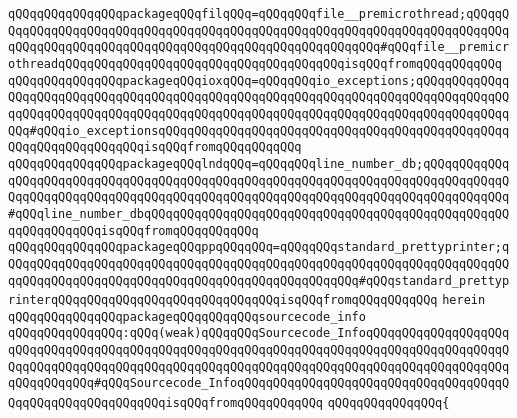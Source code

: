 \verb|qQQqqQQqqQQqqQQqpackageqQQqfilqQQq=qQQqqQQqfile__premicrothread;qQQqqQQqqQQqqQQqqQQqqQQqqQQqqQQqqQQqqQQqqQQqqQQqqQQqqQQqqQQqqQQqqQQqqQQqqQQqqQQqqQQqqQQqqQQqqQQqqQQqqQQqqQQqqQQqqQQqqQQqqQQqqQQq#qQQqfile__premicrothreadqQQqqQQqqQQqqQQqqQQqqQQqqQQqqQQqqQQqqQQqisqQQqfromqQQqqQQqqQQq|\newline
\verb|qQQqqQQqqQQqqQQqpackageqQQqioxqQQq=qQQqqQQqio_exceptions;qQQqqQQqqQQqqQQqqQQqqQQqqQQqqQQqqQQqqQQqqQQqqQQqqQQqqQQqqQQqqQQqqQQqqQQqqQQqqQQqqQQqqQQqqQQqqQQqqQQqqQQqqQQqqQQqqQQqqQQqqQQqqQQqqQQqqQQqqQQqqQQqqQQqqQQqqQQq#qQQqio_exceptionsqQQqqQQqqQQqqQQqqQQqqQQqqQQqqQQqqQQqqQQqqQQqqQQqqQQqqQQqqQQqqQQqqQQqisqQQqfromqQQqqQQqqQQq|\newline
\verb|qQQqqQQqqQQqqQQqpackageqQQqlndqQQq=qQQqqQQqline_number_db;qQQqqQQqqQQqqQQqqQQqqQQqqQQqqQQqqQQqqQQqqQQqqQQqqQQqqQQqqQQqqQQqqQQqqQQqqQQqqQQqqQQqqQQqqQQqqQQqqQQqqQQqqQQqqQQqqQQqqQQqqQQqqQQqqQQqqQQqqQQqqQQqqQQqqQQq#qQQqline_number_dbqQQqqQQqqQQqqQQqqQQqqQQqqQQqqQQqqQQqqQQqqQQqqQQqqQQqqQQqqQQqqQQqisqQQqfromqQQqqQQqqQQq|\newline
\verb|qQQqqQQqqQQqqQQqpackageqQQqppqQQqqQQq=qQQqqQQqstandard_prettyprinter;qQQqqQQqqQQqqQQqqQQqqQQqqQQqqQQqqQQqqQQqqQQqqQQqqQQqqQQqqQQqqQQqqQQqqQQqqQQqqQQqqQQqqQQqqQQqqQQqqQQqqQQqqQQqqQQqqQQqqQQq#qQQqstandard_prettyprinterqQQqqQQqqQQqqQQqqQQqqQQqqQQqqQQqisqQQqfromqQQqqQQqqQQq|\newline
\verb|herein|\newline
\newline
\verb|qQQqqQQqqQQqqQQqpackageqQQqqQQqqQQqsourcecode_info|\newline
\verb|qQQqqQQqqQQqqQQq:qQQq(weak)qQQqqQQqSourcecode_InfoqQQqqQQqqQQqqQQqqQQqqQQqqQQqqQQqqQQqqQQqqQQqqQQqqQQqqQQqqQQqqQQqqQQqqQQqqQQqqQQqqQQqqQQqqQQqqQQqqQQqqQQqqQQqqQQqqQQqqQQqqQQqqQQqqQQqqQQqqQQqqQQqqQQqqQQqqQQqqQQqqQQqqQQqqQQq#qQQqSourcecode_InfoqQQqqQQqqQQqqQQqqQQqqQQqqQQqqQQqqQQqqQQqqQQqqQQqqQQqqQQqqQQqisqQQqfromqQQqqQQqqQQq|\newline
\verb|qQQqqQQqqQQqqQQq{|\newline
